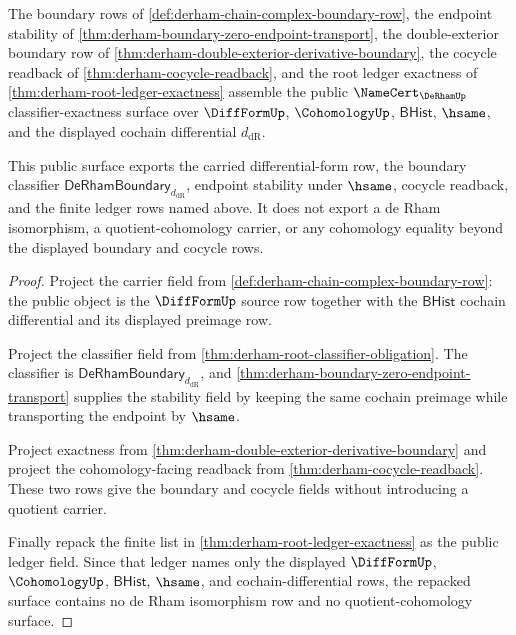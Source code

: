 \begin{theorem}
\label{thm:derham-boundary-public-classifier-exactness}
The boundary rows of \autoref{def:derham-chain-complex-boundary-row}, the
endpoint stability of
\autoref{thm:derham-boundary-zero-endpoint-transport}, the double-exterior
boundary row of
\autoref{thm:derham-double-exterior-derivative-boundary}, the cocycle
readback of \autoref{thm:derham-cocycle-readback}, and the root ledger
exactness of \autoref{thm:derham-root-ledger-exactness} assemble the public
$\NameCert_{\DeRhamUp}$ classifier-exactness surface over $\DiffFormUp$,
$\CohomologyUp$, $\mathsf{BHist}$, $\hsame$, and the displayed cochain
differential $d_{\mathrm{dR}}$.

This public surface exports the carried differential-form row, the boundary
classifier $\mathsf{DeRhamBoundary}_{d_{\mathrm{dR}}}$, endpoint stability
under $\hsame$, cocycle readback, and the finite ledger rows named above. It
does not export a de Rham isomorphism, a quotient-cohomology carrier, or any
cohomology equality beyond the displayed boundary and cocycle rows.
\end{theorem}
\begin{proof}
Project the carrier field from
\autoref{def:derham-chain-complex-boundary-row}: the public object is the
$\DiffFormUp$ source row together with the $\mathsf{BHist}$ cochain
differential and its displayed preimage row.

Project the classifier field from
\autoref{thm:derham-root-classifier-obligation}. The classifier is
$\mathsf{DeRhamBoundary}_{d_{\mathrm{dR}}}$, and
\autoref{thm:derham-boundary-zero-endpoint-transport} supplies the stability
field by keeping the same cochain preimage while transporting the endpoint by
$\hsame$.

Project exactness from
\autoref{thm:derham-double-exterior-derivative-boundary} and project the
cohomology-facing readback from \autoref{thm:derham-cocycle-readback}. These
two rows give the boundary and cocycle fields without introducing a quotient
carrier.

Finally repack the finite list in
\autoref{thm:derham-root-ledger-exactness} as the public ledger field. Since
that ledger names only the displayed $\DiffFormUp$, $\CohomologyUp$,
$\mathsf{BHist}$, $\hsame$, and cochain-differential rows, the repacked
surface contains no de Rham isomorphism row and no quotient-cohomology
surface.
\end{proof}

